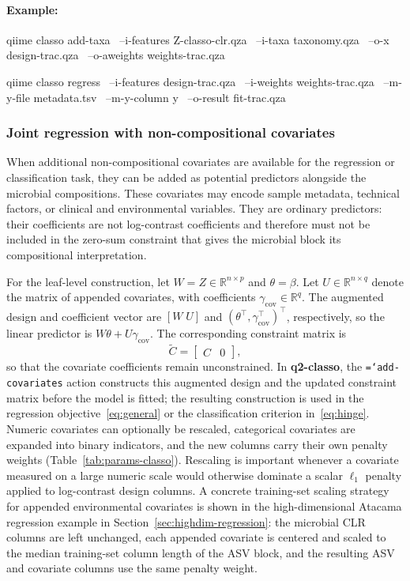\documentclass[11pt,a4paper]{article}
\newcommand{\code}[1]{\allowbreak\texttt{\hyphenchar\font=`\-\relax #1}}
\newcommand{\pkg}[1]{\textbf{#1}}
\newcommand{\R}{\mathbb{R}}
\newcommand{\bbeta}{\beta}
\begin{document}
\paragraph{Example:} \mbox{}
\begin{PseudoCode}
qiime classo add-taxa \
    --i-features Z-classo-clr.qza \
    --i-taxa taxonomy.qza \
    --o-x design-trac.qza \
    --o-aweights weights-trac.qza

qiime classo regress \
    --i-features design-trac.qza \
    --i-weights weights-trac.qza \
    --m-y-file metadata.tsv \
    --m-y-column y \
    --o-result fit-trac.qza
\end{PseudoCode}

\subsubsection{Joint regression with non-compositional covariates}
When additional non-compositional covariates are available for the regression or
classification task, they can be added as potential predictors alongside the
microbial compositions. These covariates may encode sample metadata,
technical factors, or clinical and environmental variables. They are ordinary
predictors: their coefficients are not log-contrast coefficients and therefore
must not be included in the zero-sum constraint that gives the microbial block
its compositional interpretation.

For the leaf-level construction, let $W=Z\in\R^{n\times p}$ and
$\theta=\bbeta$. Let $U\in\R^{n\times q}$ denote the matrix of appended
covariates, with coefficients $\gamma_{\mathrm{cov}}\in\R^q$. The augmented
design and coefficient vector are $[W\;U]$ and
$(\theta^\top,\gamma_{\mathrm{cov}}^\top)^\top$, respectively, so the linear
predictor is $W\theta+U\gamma_{\mathrm{cov}}$. The corresponding constraint
matrix is
\begin{equation}
\widetilde C = \begin{bmatrix} C & 0 \end{bmatrix},
\end{equation}
so that the covariate coefficients remain unconstrained. In \pkg{q2-classo}, the
\code{add-covariates} action constructs this augmented design and the updated
constraint matrix before the model is fitted; the resulting construction is used
in the regression objective~\eqref{eq:general} or the classification criterion
in~\eqref{eq:hinge}. Numeric covariates can optionally
be rescaled, categorical covariates are expanded into binary indicators, and the
new columns carry their own penalty weights (Table~\ref{tab:params-classo}).
Rescaling is important whenever a covariate measured on a large numeric scale
would otherwise dominate a scalar $\ell_1$ penalty applied to log-contrast design
columns. A concrete training-set scaling strategy for appended environmental
covariates is shown in the high-dimensional Atacama regression example in
Section~\ref{sec:highdim-regression}: the microbial CLR columns are left
unchanged, each appended covariate is centered and scaled to the median
training-set column length of the ASV block, and the resulting ASV and covariate
columns use the same penalty weight.
\end{document}
